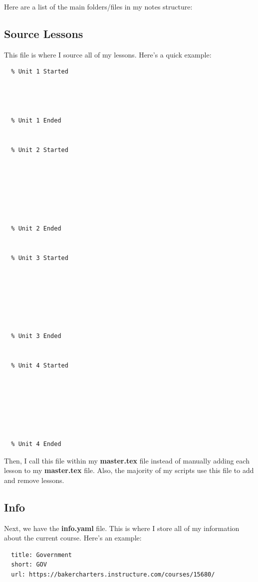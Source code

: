 Here are a list of the main folders/files in my notes structure:

\subsection{Source Lessons}
\label{sub_sec:source-lessons}

This file is where I source all of my lessons. Here's a quick example:

\begin{verbatim}
  % Unit 1 Started
  
  
  
  
  % Unit 1 Ended


  % Unit 2 Started
  
  
  
  
  
  
  
  % Unit 2 Ended


  % Unit 3 Started
  
  
  
  
  
  
  
  % Unit 3 Ended


  % Unit 4 Started
  
  
  
  
  
  
  
  % Unit 4 Ended
\end{verbatim}

Then, I call this file within my \textbf{master.tex} file instead of manually
adding each lesson to my \textbf{master.tex} file. Also, the majority of my
scripts use this file to add and remove lessons.


\subsection{Info}
\label{sub_sec:info}

Next, we have the \textbf{info.yaml} file. This is where I store all of my
information about the current course. Here's an example:

\begin{verbatim}
  title: Government
  short: GOV
  url: https://bakercharters.instructure.com/courses/15680/
\end{verbatim}


